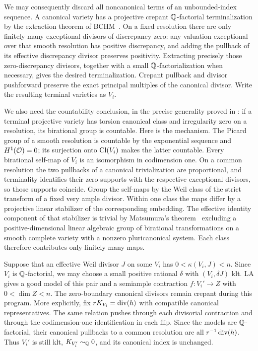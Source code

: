 We may consequently discard all noncanonical terms of an
unbounded-index sequence.  A canonical variety has a projective
crepant $\mathbb Q$-factorial terminalization by the extraction theorem of
BCHM~\cite{BCHM2010}.  On a fixed resolution there are only finitely many
exceptional divisors of discrepancy zero: any valuation exceptional
over that smooth resolution has positive discrepancy, and adding
the pullback of its effective discrepancy divisor preserves
positivity.  Extracting precisely those zero-discrepancy divisors,
together with a small $\mathbb Q$-factorialization when necessary, gives
the desired terminalization.  Crepant pullback and divisor pushforward
preserve the exact principal multiples of the canonical divisor.
Write the resulting terminal varieties as $V_i$.

We also need the countability conclusion, in the precise generality
proved in \cite[Lemma 8.2]{U4}: if a
terminal projective variety has torsion canonical class and
irregularity zero on a resolution, its birational group is countable.
Here is the mechanism.  The Picard group of a smooth resolution is
countable by the exponential sequence and $H^1(\mathcal O)=0$; its
surjection onto $\operatorname{Cl}(V_i)$ makes the latter countable.  Every
birational self-map of $V_i$ is an isomorphism in codimension one.
On a common resolution the two pullbacks of a canonical
trivialization are proportional, and terminality identifies their
zero supports with the respective exceptional divisors, so those
supports coincide.  Group the self-maps by the Weil class of the
strict transform of a fixed very ample divisor.  Within one class
the maps differ by a projective linear stabilizer of the corresponding
embedding.  The effective identity component of that stabilizer is
trivial by Matsumura's theorem~\cite[Corollary~1]{Matsumura1963}
excluding a positive-dimensional
linear algebraic group of birational transformations on a smooth
complete variety with a nonzero pluricanonical system.  Each class
therefore contributes only finitely many maps.

Suppose that an effective Weil divisor $J$ on some $V_i$ has
$0<\kappa(V_i,J)<n$.  Since $V_i$ is $\mathbb Q$-factorial, we may choose
a small positive rational $\delta$ with $(V_i,\delta J)$ klt.
LA gives a good model of this pair and a semiample contraction
$f:V_i'\to Z$ with $0<\dim Z<n$.  The zero-boundary canonical
divisors remain crepant during this program.  More explicitly, fix
$rK_{V_i}=\operatorname{div}(h)$ with compatible canonical representatives.  The
same relation pushes through each divisorial contraction and through
the codimension-one identification in each flip.  Since the models
are $\mathbb Q$-factorial, their canonical pullbacks to a common resolution
are all $r^{-1}\operatorname{div}(h)$.  Thus $V_i'$ is still klt,
$K_{V_i'}\sim_{\mathbb Q}0$, and its canonical index is unchanged.

